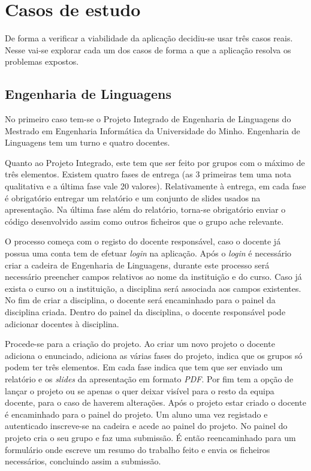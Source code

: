 \section{Casos de estudo}
De forma a verificar a viabilidade da aplicação decidiu-se usar três casos reais. Nesse vai-se explorar cada um dos casos de forma a que a aplicação resolva os problemas expostos.

\subsection{Engenharia de Linguagens} %
\label{sub:engenharia_de_linguagens}


No primeiro caso tem-se o Projeto Integrado de Engenharia de Linguagens do Mestrado em Engenharia Informática da Universidade do Minho.
Engenharia de Linguagens tem um turno e quatro docentes.

Quanto ao Projeto Integrado, este tem que ser feito por grupos com o máximo de três elementos. Existem quatro fases de entrega (as 3 primeiras tem uma nota qualitativa e a última fase vale 20 valores). Relativamente à entrega, em cada fase é obrigatório entregar um relatório e um conjunto de slides usados na apresentação. Na última fase além do relatório, torna-se obrigatório enviar o código desenvolvido assim como outros ficheiros que o grupo ache relevante.

O processo começa com o registo do docente responsável, caso o docente já possua uma conta tem de efetuar \emph{login} na aplicação. Após o \emph{login} é necessário criar a cadeira de Engenharia de Linguagens, durante este processo será necessário preencher campos relativos ao nome da instituição e do curso. Caso já  exista o curso ou a instituição, a disciplina será associada aos campos existentes. No fim de criar a disciplina, o docente será encaminhado para o painel da disciplina criada. Dentro do painel da disciplina, o docente responsável pode adicionar docentes à disciplina.

Procede-se para a criação do projeto. Ao criar um novo projeto o docente adiciona o enunciado, adiciona as várias fases do projeto, indica que os grupos só podem ter três elementos. Em cada fase indica que tem que ser enviado um relatório e os \emph{slides} da apresentação em formato \emph{PDF}. Por fim tem a opção de lançar o projeto ou se apenas o quer deixar visível para o resto da equipa docente, para o caso de haverem alterações. Após o projeto estar criado o docente é encaminhado para o painel do projeto.
Um aluno uma vez registado e autenticado inscreve-se na cadeira e acede ao painel do projeto. No painel do projeto cria o seu grupo e faz uma submissão. É então reencaminhado para um formulário onde escreve um resumo do trabalho feito e envia os ficheiros necessários, concluindo assim a submissão.

